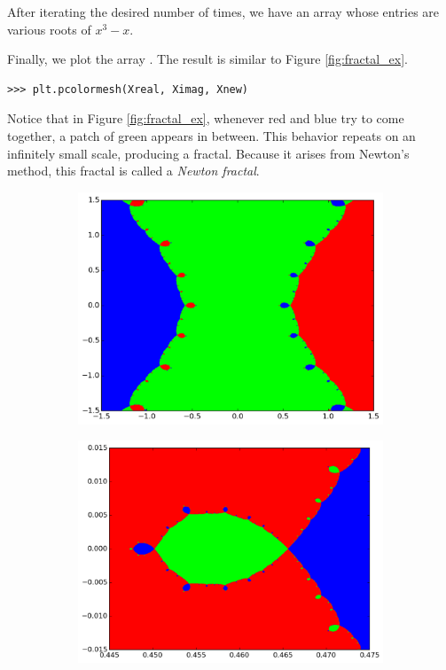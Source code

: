 After iterating the desired number of times, we have an array  whose entries are various roots of $x^3-x$.

Finally, we plot the array . The result is similar to Figure \ref{fig:fractal_ex}.

\begin{lstlisting}
>>> plt.pcolormesh(Xreal, Ximag, Xnew)
\end{lstlisting}

Notice that in Figure \ref{fig:fractal_ex}, whenever red and blue try to come together, a patch of green appears in between.
This behavior repeats on an infinitely small scale, producing a fractal.
Because it arises from Newton's method, this fractal is called a \emph{Newton fractal}.

\begin{figure}
\begin{center}
\begin{subfigure}[b]{.49\textwidth}
\centering
\includegraphics[width=\textwidth]{figures/fractal_ex.pdf}
\end{subfigure}
\begin{subfigure}[b]{.49\textwidth}
\centering
\includegraphics[width=\textwidth]{figures/fractal_zoom.pdf}

\end{subfigure}
\end{center}
\end{figure}
